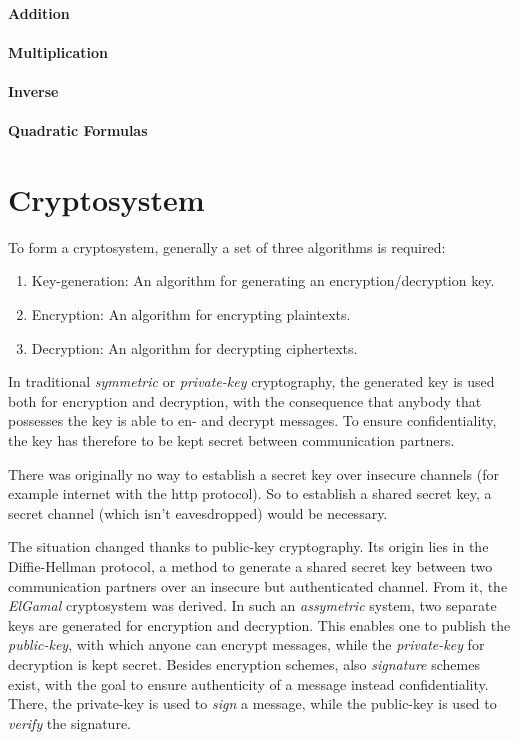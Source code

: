 \documentclass[11pt,english]{article}
\begin{document}
\paragraph{Addition}
\paragraph{Multiplication}
\paragraph{Inverse}
\paragraph{Quadratic Formulas}

\section{Cryptosystem}
To form a cryptosystem, generally a set of three algorithms is required:
\begin{enumerate}
 \item Key-generation: An algorithm for generating an encryption/decryption key.
 \item Encryption: An algorithm for encrypting plaintexts.
 \item Decryption: An algorithm for decrypting ciphertexts.
\end{enumerate}
In traditional \emph{symmetric} or \emph{private-key} cryptography, the generated key is used both for encryption and decryption, with the consequence that anybody that possesses the key is able to en- and decrypt messages. To ensure confidentiality, the key has therefore to be kept secret between communication partners.

There was originally no way to establish a secret key over insecure channels (for example internet with the http protocol). So to establish a shared secret key, a secret channel (which isn't eavesdropped) would be necessary.

The situation changed thanks to public-key cryptography. Its origin lies in the Diffie-Hellman \cite{Diffie76newdirections} protocol, a method to generate a shared secret key between two communication partners over an insecure but authenticated channel. From it, the \emph{ElGamal} cryptosystem \cite{19480} was derived. In such an \emph{assymetric} system, two separate keys are generated for encryption and decryption. This enables one to publish the \emph{public-key}, with which anyone can encrypt messages, while the \emph{private-key} for decryption is kept secret. Besides encryption schemes, also \emph{signature} schemes exist, with the goal to ensure authenticity of a message instead confidentiality. There, the private-key is used to \emph{sign} a message, while the public-key is used to \emph{verify} the signature.
\end{document}
